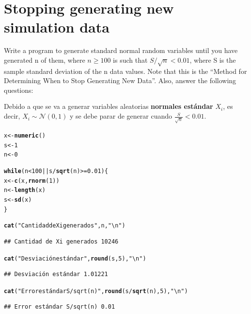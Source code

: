 \documentclass[12pt]{article}\usepackage[]{graphicx}\usepackage[]{xcolor}
\makeatletter
\newcommand{\hlnum}[1]{\textcolor[rgb]{0.686,0.059,0.569}{#1}}%
\newcommand{\hlsng}[1]{\textcolor[rgb]{0.192,0.494,0.8}{#1}}%
\newcommand{\hlopt}[1]{\textcolor[rgb]{0,0,0}{#1}}%
\newcommand{\hldef}[1]{\textcolor[rgb]{0.345,0.345,0.345}{#1}}%
\newcommand{\hlkwa}[1]{\textcolor[rgb]{0.161,0.373,0.58}{\textbf{#1}}}%
\newcommand{\hlkwb}[1]{\textcolor[rgb]{0.69,0.353,0.396}{#1}}%
\newcommand{\hlkwd}[1]{\textcolor[rgb]{0.737,0.353,0.396}{\textbf{#1}}}%
\newenvironment{kframe}{%
 \def\at@end@of@kframe{}%
 \ifinner\ifhmode%
  \def\at@end@of@kframe{\end{minipage}}%
  \begin{minipage}{\columnwidth}%
 \fi\fi%
 \def\FrameCommand##1{\hskip\@totalleftmargin \hskip-\fboxsep
 \colorbox{shadecolor}{##1}\hskip-\fboxsep
     \hskip-\linewidth \hskip-\@totalleftmargin \hskip\columnwidth}%
 \MakeFramed {\advance\hsize-\width
   \@totalleftmargin\z@ \linewidth\hsize
   \@setminipage}}%
 {\par\unskip\endMakeFramed%
 \at@end@of@kframe}
\newenvironment{knitrout}{}{} %
\makeatother
\begin{document}
\section{Stopping generating new simulation data}

Write a program to generate standard normal random variables until you have generated n of them, where $n \geq 100$ is such that $S/\sqrt{n} < 0.01$, where S is the sample standard deviation of the n data values. Note that this is the ``Method for Determining When to Stop Generating New Data''. Also, answer the following questions:



Debido a que se va a generar variables aleatorias \textbf{normales estándar} $X_{i}$, es decir, $X_{i} \sim \mathcal{N}(0, 1)$ y se debe parar de generar cuando $\frac{S}{\sqrt{n}} < 0.01$.

\begin{knitrout}
\color{fgcolor}\begin{kframe}
\begin{alltt}
\hldef{x} \hlkwb{<-} \hlkwd{numeric}\hldef{()}
\hldef{s} \hlkwb{<-} \hlnum{1}
\hldef{n} \hlkwb{<-} \hlnum{0}

\hlkwa{while}\hldef{(n} \hlopt{<} \hlnum{100} \hlopt{||} \hldef{s} \hlopt{/} \hlkwd{sqrt}\hldef{(n)} \hlopt{>=} \hlnum{0.01}\hldef{) \{}
  \hldef{x} \hlkwb{<-} \hlkwd{c}\hldef{(x,} \hlkwd{rnorm}\hldef{(}\hlnum{1}\hldef{))}
  \hldef{n} \hlkwb{<-} \hlkwd{length}\hldef{(x)}
  \hldef{s} \hlkwb{<-} \hlkwd{sd}\hldef{(x)}
\hldef{\}}

\hlkwd{cat}\hldef{(}\hlsng{"Cantidad de Xi generados"}\hldef{, n,} \hlsng{"\textbackslash{}n"}\hldef{)}
\end{alltt}
\begin{verbatim}
## Cantidad de Xi generados 10246
\end{verbatim}
\begin{alltt}
\hlkwd{cat}\hldef{(}\hlsng{"Desviación estándar"}\hldef{,} \hlkwd{round}\hldef{(s,} \hlnum{5}\hldef{),} \hlsng{"\textbackslash{}n"}\hldef{)}
\end{alltt}
\begin{verbatim}
## Desviación estándar 1.01221
\end{verbatim}
\begin{alltt}
\hlkwd{cat}\hldef{(}\hlsng{"Error estándar S/sqrt(n)"}\hldef{,} \hlkwd{round}\hldef{(s}\hlopt{/}\hlkwd{sqrt}\hldef{(n),} \hlnum{5}\hldef{),} \hlsng{"\textbackslash{}n"}\hldef{)}
\end{alltt}
\begin{verbatim}
## Error estándar S/sqrt(n) 0.01
\end{verbatim}
\end{kframe}
\end{knitrout}
\end{document}
